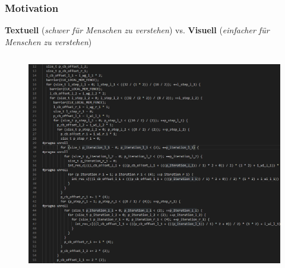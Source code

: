 \documentclass{presentation}
\begin{document}
\begin{frame}[fragile]
	\frametitle{Motivation}
	\textbf{Textuell} (\textit{schwer für Menschen zu verstehen}) vs. \textbf{Visuell} (\textit{einfacher für Menschen zu verstehen})
	
	\begin{columns}
			\begin{figure}
				\includegraphics[width=0.9\linewidth]{images/gemm_opencl.png}
			\end{figure}
	\end{columns}
\end{frame}
\end{document}
